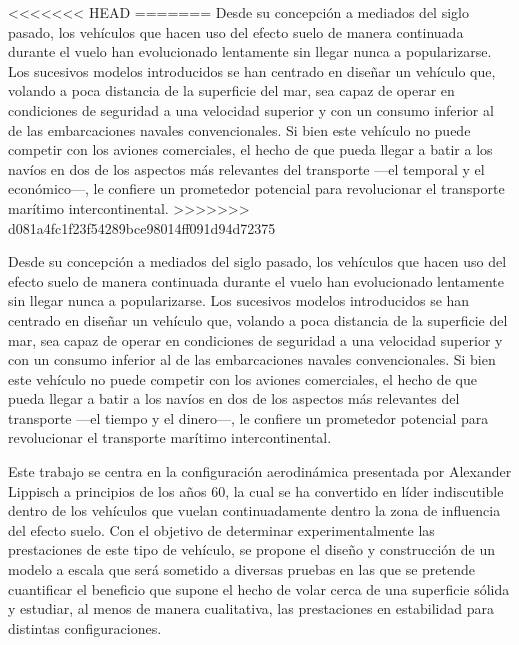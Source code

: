 <<<<<<< HEAD
=======
Desde su concepción a mediados del siglo pasado, los vehículos que hacen uso del efecto suelo de manera continuada durante el vuelo han evolucionado lentamente sin llegar nunca a popularizarse. Los sucesivos modelos introducidos se han centrado en diseñar un vehículo que, volando a poca distancia de la superficie del mar, sea capaz de operar en condiciones de seguridad a una velocidad superior y con un consumo inferior al de las embarcaciones navales convencionales. Si bien este vehículo no puede competir con los aviones comerciales, el hecho de que pueda llegar a batir a los navíos en dos de los aspectos más relevantes del transporte —el temporal y el económico—, le confiere un prometedor potencial para revolucionar el transporte marítimo intercontinental.
>>>>>>> d081a4fc1f23f54289bce98014ff091d94d72375

Desde su concepción a mediados del siglo pasado, los vehículos que hacen uso del efecto suelo de manera continuada durante el vuelo han evolucionado lentamente sin llegar nunca a popularizarse. Los sucesivos modelos introducidos se han centrado en diseñar un vehículo que, volando a poca distancia de la superficie del mar, sea capaz de operar en condiciones de seguridad a una velocidad superior y con un consumo inferior al de las embarcaciones navales convencionales. Si bien este vehículo no puede competir con los aviones comerciales, el hecho de que pueda llegar a batir a los navíos en dos de los aspectos más relevantes del transporte —el tiempo y el dinero—, le confiere un prometedor potencial para revolucionar el transporte marítimo intercontinental.

Este trabajo se  centra en la configuración aerodinámica presentada por Alexander Lippisch a principios de los años 60, la cual se ha convertido en líder indiscutible dentro de los vehículos que vuelan continuadamente dentro la zona de influencia del efecto suelo. Con el objetivo de determinar experimentalmente las prestaciones de este tipo de vehículo, se propone el diseño y construcción de un modelo a escala que será sometido a diversas pruebas en las que se pretende cuantificar el beneficio que supone el hecho de volar cerca de una superficie sólida y estudiar, al menos de manera cualitativa, las prestaciones en estabilidad para distintas configuraciones.
